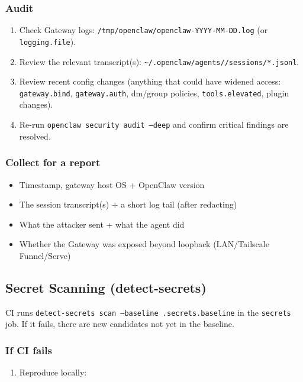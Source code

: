 \subsubsection{Audit}


\begin{enumerate}
  \item Check Gateway logs: \texttt{/tmp/openclaw/openclaw-YYYY-MM-DD.log} (or \texttt{logging.file}).
  \item Review the relevant transcript(s): \texttt{\textasciitilde{}/.openclaw/agents//sessions/*.jsonl}.
  \item Review recent config changes (anything that could have widened access: \texttt{gateway.bind}, \texttt{gateway.auth}, dm/group policies, \texttt{tools.elevated}, plugin changes).
  \item Re-run \texttt{openclaw security audit --deep} and confirm critical findings are resolved.
\end{enumerate}


\subsubsection{Collect for a report}


\begin{itemize}
  \item Timestamp, gateway host OS + OpenClaw version
  \item The session transcript(s) + a short log tail (after redacting)
  \item What the attacker sent + what the agent did
  \item Whether the Gateway was exposed beyond loopback (LAN/Tailscale Funnel/Serve)
\end{itemize}


\subsection{Secret Scanning (detect-secrets)}


CI runs \texttt{detect-secrets scan --baseline .secrets.baseline} in the \texttt{secrets} job.
If it fails, there are new candidates not yet in the baseline.

\subsubsection{If CI fails}


\begin{enumerate}
  \item Reproduce locally:
\end{enumerate}


